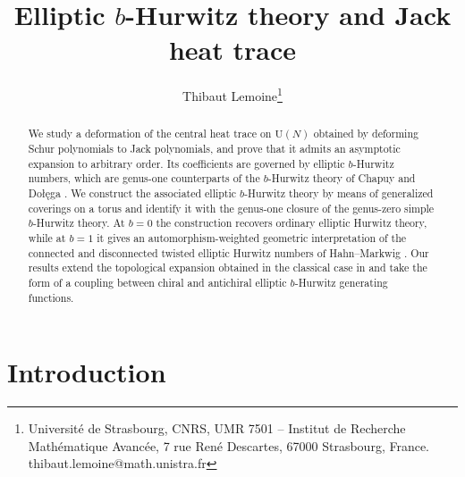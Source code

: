 \documentclass[11pt,a4paper,reqno]{article}
\title{Elliptic $b$-Hurwitz theory and Jack heat trace}
\author{Thibaut Lemoine\thanks{Universit\'e de Strasbourg, CNRS, UMR 7501 -- Institut de Recherche Math\'ematique Avanc\'ee, 7 rue Ren\'e Descartes, 67000 Strasbourg, France. thibaut.lemoine@math.unistra.fr}}
\theoremstyle{definition}
\theoremstyle{remark}
\begin{document}
\maketitle

\begin{abstract}
We study a deformation of the central heat trace on $\mathrm U(N)$ obtained by deforming Schur polynomials to Jack polynomials, and prove that it admits an asymptotic expansion to arbitrary order. Its coefficients are governed by elliptic $b$-Hurwitz numbers, which are genus-one counterparts of the $b$-Hurwitz theory of Chapuy and Do\l\k{e}ga \cite{ChapuyDolega22}. We construct the associated elliptic $b$-Hurwitz theory by means of generalized coverings on a torus and identify it with the genus-one closure of the genus-zero simple $b$-Hurwitz theory. At $b=0$ the construction recovers ordinary elliptic Hurwitz theory, while at $b=1$ it gives an automorphism-weighted geometric interpretation of the connected and disconnected twisted elliptic Hurwitz numbers of Hahn--Markwig \cite{HahnMarkwig26}. Our results extend the topological expansion obtained in the classical case in \cite{LemMai25,LM2} and take the form of a coupling between chiral and antichiral elliptic $b$-Hurwitz generating functions.
\end{abstract}

\tableofcontents

\section{Introduction}
\end{document}
